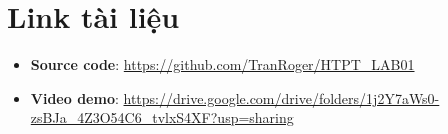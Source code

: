 \section{Link tài liệu}

\begin{itemize}
    \item \textbf{Source code}: \url{https://github.com/TranRoger/HTPT_LAB01}
    \item \textbf{Video demo}: \url{https://drive.google.com/drive/folders/1j2Y7aWs0-zsBJa_4Z3O54C6_tvlxS4XF?usp=sharing}
\end{itemize}
